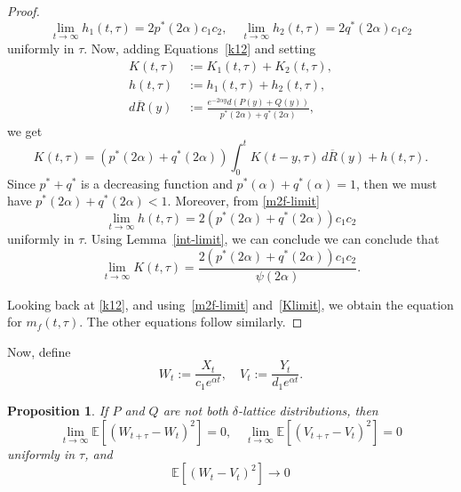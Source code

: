 \documentclass[12pt]{amsart}
\theoremstyle{plain}
\newtheorem{prop}[thm]{Proposition}
\theoremstyle{definition}
\theoremstyle{remark}
\theoremstyle{definition}
\begin{document}
\begin{proof}
\begin{equation}
\lim_{t \to \infty} h_1(t,\tau) = 2p^*(2\alpha) c_1c_2 , \quad
\lim_{t \to \infty} h_2(t,\tau) = 2q^*(2\alpha) c_1c_2 \label{m2f-limit}
\end{equation}
uniformly in $\tau$. Now, adding Equations~\eqref{k12} and setting
\begin{equation}
\begin{aligned}
K(t,\tau) &:= K_1(t,\tau) + K_2(t,\tau), \\
h(t,\tau) &:= h_1(t,\tau) + h_2(t,\tau), \\
d\overline{R}(y) &:= \frac{e^{-2\alpha y}d(P(y)+Q(y))}{p^*(2\alpha)+q^*(2\alpha)},
\end{aligned}
\end{equation}
we get
\begin{equation}
K(t,\tau) = (p^*(2\alpha) + q^*(2\alpha)) \int_0^t K(t-y,\tau) \, d\overline{R}(y) + h(t,\tau). 
\end{equation}
Since $p^*+q^*$ is a decreasing function and $p^*(\alpha) + q^*(\alpha) = 1$, then we must have $p^*(2\alpha) + q^*(2\alpha) < 1$.
Moreover, from \eqref{m2f-limit}
\begin{equation}
\lim_{t \to \infty} h(t,\tau) = 2(p^*(2\alpha) + q^*(2\alpha)) c_1c_2
\end{equation}
uniformly in $\tau$. Using Lemma~\ref{int-limit}, we can conclude we can conclude that
\begin{equation}
\lim_{t \to \infty} K(t,\tau) = \frac{2(p^*(2\alpha) + q^*(2\alpha)) c_1c_2}{\psi(2\alpha)} \label{Klimit}.
\end{equation}

Looking back at \eqref{k12}, and using~\eqref{m2f-limit} and~\eqref{Klimit}, we obtain the equation for $m_f(t,\tau)$.  The other equations follow similarly.
\end{proof}

Now, define
\begin{equation}
W_t := \frac{X_t}{c_1 e^{\alpha t}}, \quad
V_t := \frac{Y_t}{d_1 e^{\alpha t}}.
\end{equation}

\begin{prop}
If $P$ and $Q$ are not both $\delta$-lattice distributions, then
\begin{equation}
\lim_{t \to \infty} \mathbb{E}\left[\left(W_{t+\tau} - W_t \right)^2 \right] = 0, \quad
\lim_{t \to \infty} \mathbb{E}\left[\left(V_{t+\tau} - V_t \right)^2 \right] = 0
\end{equation}
uniformly in $\tau$, and
\begin{equation}
\mathbb{E}\left[\left(W_t - V_t \right)^2 \right] \to 0
\end{equation}
\end{prop}
\end{document}
